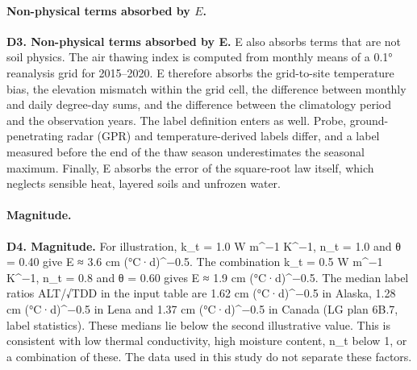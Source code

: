 \paragraph*{Non-physical terms absorbed by $E$.} \textbf{D3. Non-physical terms absorbed by E.} E also absorbs terms that are not soil physics. The air thawing index is computed from monthly means of a 0.1° reanalysis grid for 2015–2020. E therefore absorbs the grid-to-site temperature bias, the elevation mismatch within the grid cell, the difference between monthly and daily degree-day sums, and the difference between the climatology period and the observation years. The label definition enters as well. Probe, ground-penetrating radar (GPR) and temperature-derived labels differ, and a label measured before the end of the thaw season underestimates the seasonal maximum. Finally, E absorbs the error of the square-root law itself, which neglects sensible heat, layered soils and unfrozen water\cite{RomanovskyOsterkamp1997}.

\paragraph*{Magnitude.} \textbf{D4. Magnitude.} For illustration, k\_t = 1.0 W m\textasciicircum{}−1 K\textasciicircum{}−1, n\_t = 1.0 and θ = 0.40 give E ≈ 3.6 cm (°C·d)\textasciicircum{}−0.5. The combination k\_t = 0.5 W m\textasciicircum{}−1 K\textasciicircum{}−1, n\_t = 0.8 and θ = 0.60 gives E ≈ 1.9 cm (°C·d)\textasciicircum{}−0.5. The median label ratios ALT/√TDD in the input table are 1.62 cm (°C·d)\textasciicircum{}−0.5 in Alaska, 1.28 cm (°C·d)\textasciicircum{}−0.5 in Lena and 1.37 cm (°C·d)\textasciicircum{}−0.5 in Canada (LG plan 6B.7, label statistics). These medians lie below the second illustrative value. This is consistent with low thermal conductivity, high moisture content, n\_t below 1, or a combination of these. The data used in this study do not separate these factors.

